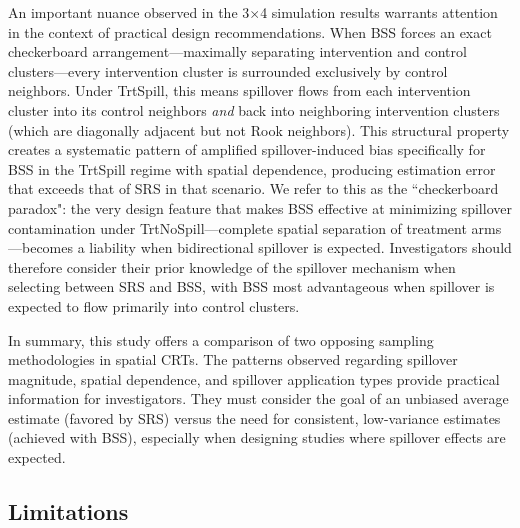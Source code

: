 \documentclass{article}[11pt]
\begin{document}
An important nuance observed in the 3$\times$4 simulation results warrants attention in the context of practical design recommendations. When BSS forces an exact checkerboard arrangement---maximally separating intervention and control clusters---every intervention cluster is surrounded exclusively by control neighbors. Under TrtSpill, this means spillover flows from each intervention cluster into its control neighbors \emph{and} back into neighboring intervention clusters (which are diagonally adjacent but not Rook neighbors). This structural property creates a systematic pattern of amplified spillover-induced bias specifically for BSS in the TrtSpill regime with spatial dependence, producing estimation error that exceeds that of SRS in that scenario. We refer to this as the ``checkerboard paradox": the very design feature that makes BSS effective at minimizing spillover contamination under TrtNoSpill---complete spatial separation of treatment arms---becomes a liability when bidirectional spillover is expected. Investigators should therefore consider their prior knowledge of the spillover mechanism when selecting between SRS and BSS, with BSS most advantageous when spillover is expected to flow primarily into control clusters.

In summary, this study offers a comparison of two opposing sampling methodologies in spatial CRTs. The patterns observed regarding spillover magnitude, spatial dependence, and spillover application types provide practical information for investigators. They must consider the goal of an unbiased average estimate (favored by SRS) versus the need for consistent, low-variance estimates (achieved with BSS), especially when designing studies where spillover effects are expected.

\subsection{Limitations}\label{section:Limitations}
\end{document}
